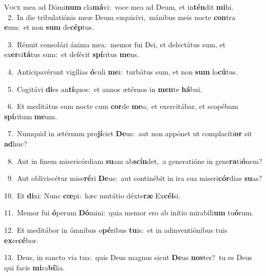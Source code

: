 \lettrine{\initial\textcolor{\initialcolor}{V}}{oce} mea ad Dómi\textbf{num} cla\-\textbf{má}\-vi:~\star voce mea ad Deum, et in\-\textbf{tén}\-dit \textbf{mi}\-hi.\\
{\numbfont\textcolor{\numbcolor}{~2.}}~In die tribulatiónis meæ Deum exquisívi,~\dagger mánibus meis nocte \textbf{con}\-tra \textbf{e}\-um:~\star et non \textbf{sum} de\-\textbf{cép}\-tus.\par
{\numbfont\textcolor{\numbcolor}{~3.}}~Rénuit consolári ánima mea:~\dagger memor fui Dei, et delectátus sum, et ex\-\textbf{er}\-ci\-\textbf{tá}\-tus sum:~\star et defécit \textbf{spí}\-ritus \textbf{me}\-us.\par
{\numbfont\textcolor{\numbcolor}{~4.}}~Anticipavérunt vigílias \textbf{ó}\-culi \textbf{me}\-i:~\star turbátus sum, et non \textbf{sum} lo\-\textbf{cú}\-tus.\par
{\numbfont\textcolor{\numbcolor}{~5.}}~Cogitávi \textbf{di}\-es an\-\textbf{tí}\-quos:~\star et annos ætérnos in \textbf{men}\-te \textbf{há}\-bui.\par
{\numbfont\textcolor{\numbcolor}{~6.}}~Et meditátus sum nocte cum \textbf{cor}\-de \textbf{me}\-o,~\star et exercitábar, et scopébam \textbf{spí}\-ritum \textbf{me}\-um.\par
{\numbfont\textcolor{\numbcolor}{~7.}}~Numquid in ætérnum pro\-\textbf{jí}\-ciet \textbf{De}\-us:~\star aut non appónet ut complacíti\textbf{or} sit \textbf{ad}\-huc?\par
{\numbfont\textcolor{\numbcolor}{~8.}}~Aut in finem misericórdiam \textbf{su}\-am ab\-\textbf{scín}\-det,~\star a generatióne in gene\-\textbf{ra}\-ti\-\textbf{ó}\-nem?\par
{\numbfont\textcolor{\numbcolor}{~9.}}~Aut obliviscétur mise\-\textbf{ré}\-ri \textbf{De}\-us:~\star aut continébit in ira sua miseri\-\textbf{cór}\-dias \textbf{su}\-as?\par
{\numbfont\textcolor{\numbcolor}{10.}}~Et \textbf{di}\-xi: Nunc \textbf{cœ}\-pi:~\star hæc mutátio déxte\textbf{ræ} Ex\-\textbf{cél}\-si.\par
{\numbfont\textcolor{\numbcolor}{11.}}~Memor fui \textbf{ó}\-perum \textbf{Dó}\-mini:~\star quia memor ero ab inítio mirabíli\textbf{um} tu\-\textbf{ó}\-rum.\par
{\numbfont\textcolor{\numbcolor}{12.}}~Et meditábor in ómnibus o\-\textbf{pé}\-ribus \textbf{tu}\-is:~\star et in adinventiónibus tuis \textbf{ex}\-er\-\textbf{cé}\-bor.\par
{\numbfont\textcolor{\numbcolor}{13.}}~Deus, in sancto via tua:~\dagger quis Deus magnus sicut \textbf{De}\-us \textbf{nos}\-ter?~\star tu es Deus qui facis \textbf{mi}\-ra\-\textbf{bí}\-lia.\par
